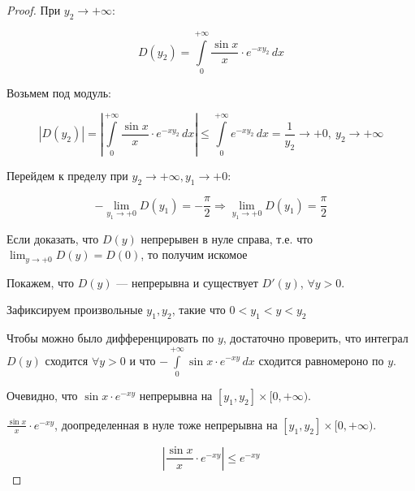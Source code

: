 \begin{proof}
\noindent При $y_2 \to +\infty$:

\[
D(y_2) = \int\limits_0^{+\infty} \frac{\sin x}{x} \cdot e^{-x y_2} \, dx
\]

Возьмем под модуль:

\[
\left| D(y_2) \right| 
= \left| \int\limits_0^{+\infty} \frac{\sin x}{x} \cdot e^{-x y_2} \, dx \right|
\leq \int\limits_0^{+\infty} e^{-x y_2} \, dx
= \frac{1}{y_2} \longrightarrow +0, \  y_2 \to +\infty
\]



\noindent Перейдем к пределу при $y_2 \rightarrow + \infty,  y_1 \rightarrow +0$: 

\[
- \lim_{y_1 \to +0} D(y_1) = -\frac{\pi}{2} \Rightarrow \lim_{y_1 \to +0} D(y_1) = \frac{\pi}{2}
\]

\begin{note}
Если доказать, что $D(y)$ непрерывен в нуле справа, т.е. что $\lim_{y \to +0} D(y) = D(0)$, то получим искомое
\end{note}

\noindent Покажем, что \( D(y) \) — непрерывна и существует \( D'(y) \), \( \forall y > 0 \).

\noindent Зафиксируем произвольные \( y_1, y_2 \), такие что \( 0 < y_1 < y < y_2 \)

\begin{center}
\end{center}


\begin{note}
Чтобы можно было дифференцировать по $y$, достаточно проверить, что интеграл $D(y)$ сходится $\forall y > 0$ и что $- \int\limits_0^{+\infty} \sin x \cdot e^{-x y} \, dx$ сходится равномероно по $y$.
\end{note}

\noindent Очевидно, что $ \sin x \cdot e^{-x y}$ непрерывна на $[y_1, y_2] \times [0, +\infty)$.

\noindent $\frac{\sin{x}}{x}\cdot e^{-x y}$, доопределенная в нуле тоже непрерывна на $[y_1, y_2] \times [0, +\infty)$.


\[
\left| \frac{\sin x}{x} \cdot e^{-x y} \right| \leq e^{-x y}
\]


\end{proof}
